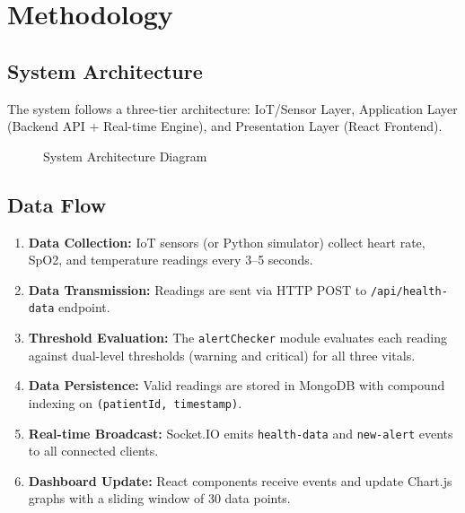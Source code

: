 \chapter{Methodology}

\section{System Architecture}
The system follows a three-tier architecture: IoT/Sensor Layer, Application Layer (Backend API + Real-time Engine), and Presentation Layer (React Frontend).

\begin{figure}[H]
\centering
{}
\caption{System Architecture Diagram}
\label{fig:architecture}
\end{figure}

\section{Data Flow}
\begin{enumerate}[leftmargin=*]
    \item \textbf{Data Collection:} IoT sensors (or Python simulator) collect heart rate, SpO2, and temperature readings every 3--5 seconds.
    \item \textbf{Data Transmission:} Readings are sent via HTTP POST to \texttt{/api/health-data} endpoint.
    \item \textbf{Threshold Evaluation:} The \texttt{alertChecker} module evaluates each reading against dual-level thresholds (warning and critical) for all three vitals.
    \item \textbf{Data Persistence:} Valid readings are stored in MongoDB with compound indexing on \texttt{(patientId, timestamp)}.
    \item \textbf{Real-time Broadcast:} Socket.IO emits \texttt{health-data} and \texttt{new-alert} events to all connected clients.
    \item \textbf{Dashboard Update:} React components receive events and update Chart.js graphs with a sliding window of 30 data points.
\end{enumerate}

